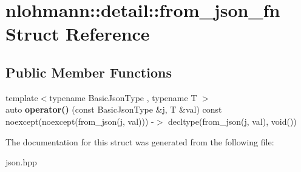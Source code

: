 \hypertarget{structnlohmann_1_1detail_1_1from__json__fn}{}\section{nlohmann\+:\+:detail\+:\+:from\+\_\+json\+\_\+fn Struct Reference}
\label{structnlohmann_1_1detail_1_1from__json__fn}
\subsection*{Public Member Functions}
\begin{DoxyCompactItemize}
\item 
\mbox{\label{structnlohmann_1_1detail_1_1from__json__fn_a6d14a74e1043072c77892534572d2973}} 
{\footnotesize template$<$typename Basic\+Json\+Type , typename T $>$ }\\auto {\bfseries operator()} (const Basic\+Json\+Type \&j, T \&val) const noexcept(noexcept(from\+\_\+json(j, val))) -\/$>$ decltype(from\+\_\+json(j, val), void())
\end{DoxyCompactItemize}


The documentation for this struct was generated from the following file\+:\begin{DoxyCompactItemize}
\item 
json.\+hpp\end{DoxyCompactItemize}
